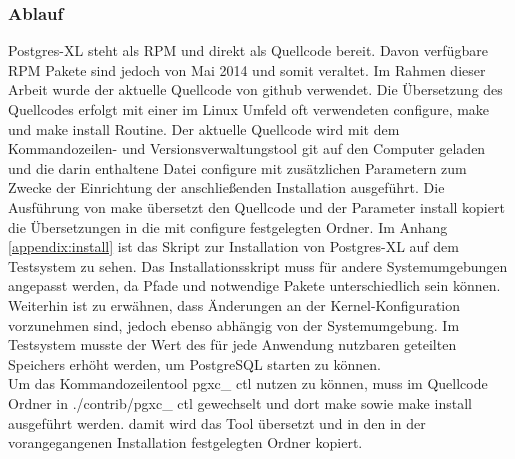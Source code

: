 \subsubsection{Ablauf}
Postgres-XL steht als RPM und direkt als Quellcode bereit.
Davon verfügbare RPM Pakete sind jedoch von Mai 2014 und somit veraltet.
Im Rahmen dieser Arbeit wurde der aktuelle Quellcode von github verwendet.
Die Übersetzung des Quellcodes erfolgt mit einer im Linux Umfeld oft verwendeten configure, make und make install Routine.
Der aktuelle Quellcode wird mit dem Kommandozeilen- und Versionsverwaltungstool git auf den Computer geladen und die darin enthaltene Datei configure mit zusätzlichen Parametern zum Zwecke der Einrichtung der anschließenden Installation ausgeführt.
Die Ausführung von make übersetzt den Quellcode und der Parameter install kopiert die Übersetzungen in die mit configure festgelegten Ordner.
Im Anhang \ref{appendix:install} ist das Skript zur Installation von Postgres-XL auf dem Testsystem zu sehen.
Das Installationsskript muss für andere Systemumgebungen angepasst werden, da Pfade und notwendige Pakete unterschiedlich sein können.
Weiterhin ist zu erwähnen, dass Änderungen an der Kernel-Konfiguration vorzunehmen  sind, jedoch ebenso abhängig von der Systemumgebung.
Im Testsystem musste der Wert des für jede Anwendung nutzbaren geteilten Speichers erhöht werden, um PostgreSQL starten zu können.\\
Um das Kommandozeilentool pgxc\_ ctl nutzen zu können, muss im Quellcode Ordner in ./contrib/pgxc\_ ctl gewechselt und dort make sowie make install ausgeführt werden. damit wird das Tool übersetzt und in den in der vorangegangenen Installation festgelegten Ordner kopiert.

